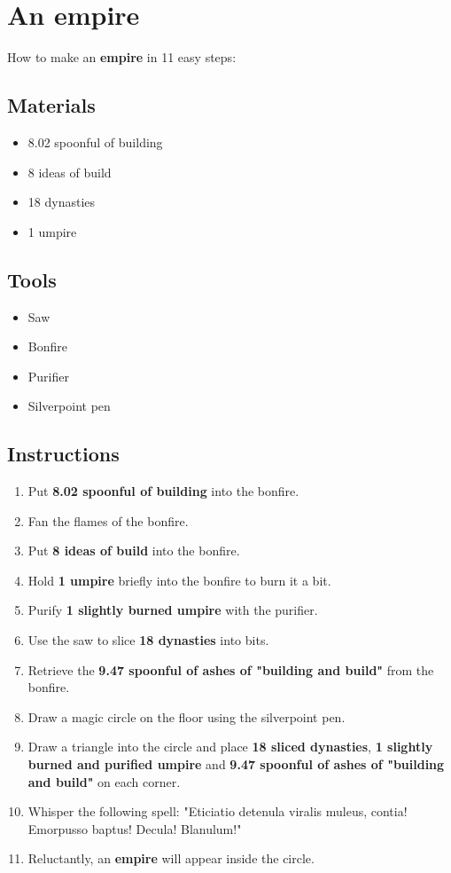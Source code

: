 \documentclass{article}
\begin{document}
\section{An empire}How to make an \textbf{empire} in 11 easy steps:

\subsection{Materials}\begin{itemize}
\item 
8.02 spoonful of building
\item 
8 ideas of build
\item 
18 dynasties
\item 
1 umpire
\end{itemize}
\subsection{Tools}\begin{itemize}
\item 
Saw
\item 
Bonfire
\item 
Purifier
\item 
Silverpoint pen
\end{itemize}
\subsection{Instructions}\begin{enumerate}
\item 
Put \textbf{8.02 spoonful of building} into the bonfire.
\item 
Fan the flames of the bonfire.
\item 
Put \textbf{8 ideas of build} into the bonfire.
\item 
Hold \textbf{1 umpire} briefly into the bonfire to burn it a bit.
\item 
Purify \textbf{1 slightly burned umpire} with the purifier.
\item 
Use the saw to slice \textbf{18 dynasties} into bits.
\item 
Retrieve the \textbf{9.47 spoonful of ashes of "building and build"} from the bonfire.
\item 
Draw a magic circle on the floor using the silverpoint pen.
\item 
Draw a triangle into the circle and place \textbf{18 sliced dynasties}, \textbf{1 slightly burned and purified umpire} and \textbf{9.47 spoonful of ashes of "building and build"} on each corner.
\item 
Whisper the following spell: "Eticiatio detenula viralis muleus, contia! Emorpusso baptus! Decula! Blanulum!"
\item 
Reluctantly, an \textbf{empire} will appear inside the circle.
\end{enumerate}
\newpage
\end{document}
